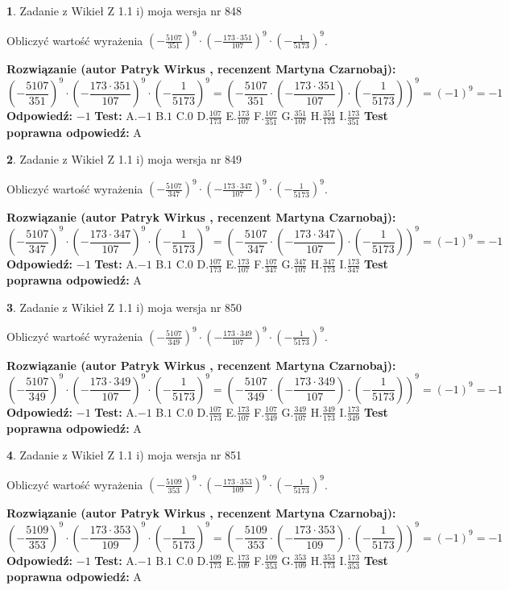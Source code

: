 \documentclass[12pt, a4paper]{article}
\theoremstyle{definition} %
\newtheorem{zad}{}
\newcommand{\zadStart}[1]{\begin{zad}#1\newline}
\newcommand{\zadStop}{\end{zad}}
\newcommand{\rozwStart}[2]{\noindent \textbf{Rozwiązanie (autor #1 , recenzent #2): }\newline}
\newcommand{\rozwStop}{\newline}
\newcommand{\odpStart}{\noindent \textbf{Odpowiedź:}\newline}
\newcommand{\odpStop}{\newline}
\newcommand{\testStart}{\noindent \textbf{Test:}\newline}
\newcommand{\testStop}{\newline}
\newcommand{\kluczStart}{\noindent \textbf{Test poprawna odpowiedź:}\newline}
\newcommand{\kluczStop}{\newline}
\begin{document}
\zadStart{Zadanie z Wikieł Z 1.1 i) moja wersja nr 848}

Obliczyć wartość wyrażenia $(-\frac{5107}{351})^{9} \cdot (-\frac{173 \cdot 351}{107})^{9} \cdot (-\frac{1}{5173})^{9}$.
\zadStop
\rozwStart{Patryk Wirkus}{Martyna Czarnobaj}
$$(-\frac{5107}{351})^{9} \cdot (-\frac{173 \cdot 351}{107})^{9} \cdot (-\frac{1}{5173})^{9} = (-\frac{5107}{351} \cdot (-\frac{173 \cdot 351}{107}) \cdot (-\frac{1}{5173}))^{9} = (-1)^{9} = -1$$
\rozwStop
\odpStart
$-1$
\odpStop
\testStart
A.$-1$ B.$1$ C.$0$ D.$\frac{107}{173}$ E.$\frac{173}{107}$
F.$\frac{107}{351}$ G.$\frac{351}{107}$
H.$\frac{351}{173}$
I.$\frac{173}{351}$
\testStop
\kluczStart
A
\kluczStop



\zadStart{Zadanie z Wikieł Z 1.1 i) moja wersja nr 849}

Obliczyć wartość wyrażenia $(-\frac{5107}{347})^{9} \cdot (-\frac{173 \cdot 347}{107})^{9} \cdot (-\frac{1}{5173})^{9}$.
\zadStop
\rozwStart{Patryk Wirkus}{Martyna Czarnobaj}
$$(-\frac{5107}{347})^{9} \cdot (-\frac{173 \cdot 347}{107})^{9} \cdot (-\frac{1}{5173})^{9} = (-\frac{5107}{347} \cdot (-\frac{173 \cdot 347}{107}) \cdot (-\frac{1}{5173}))^{9} = (-1)^{9} = -1$$
\rozwStop
\odpStart
$-1$
\odpStop
\testStart
A.$-1$ B.$1$ C.$0$ D.$\frac{107}{173}$ E.$\frac{173}{107}$
F.$\frac{107}{347}$ G.$\frac{347}{107}$
H.$\frac{347}{173}$
I.$\frac{173}{347}$
\testStop
\kluczStart
A
\kluczStop



\zadStart{Zadanie z Wikieł Z 1.1 i) moja wersja nr 850}

Obliczyć wartość wyrażenia $(-\frac{5107}{349})^{9} \cdot (-\frac{173 \cdot 349}{107})^{9} \cdot (-\frac{1}{5173})^{9}$.
\zadStop
\rozwStart{Patryk Wirkus}{Martyna Czarnobaj}
$$(-\frac{5107}{349})^{9} \cdot (-\frac{173 \cdot 349}{107})^{9} \cdot (-\frac{1}{5173})^{9} = (-\frac{5107}{349} \cdot (-\frac{173 \cdot 349}{107}) \cdot (-\frac{1}{5173}))^{9} = (-1)^{9} = -1$$
\rozwStop
\odpStart
$-1$
\odpStop
\testStart
A.$-1$ B.$1$ C.$0$ D.$\frac{107}{173}$ E.$\frac{173}{107}$
F.$\frac{107}{349}$ G.$\frac{349}{107}$
H.$\frac{349}{173}$
I.$\frac{173}{349}$
\testStop
\kluczStart
A
\kluczStop



\zadStart{Zadanie z Wikieł Z 1.1 i) moja wersja nr 851}

Obliczyć wartość wyrażenia $(-\frac{5109}{353})^{9} \cdot (-\frac{173 \cdot 353}{109})^{9} \cdot (-\frac{1}{5173})^{9}$.
\zadStop
\rozwStart{Patryk Wirkus}{Martyna Czarnobaj}
$$(-\frac{5109}{353})^{9} \cdot (-\frac{173 \cdot 353}{109})^{9} \cdot (-\frac{1}{5173})^{9} = (-\frac{5109}{353} \cdot (-\frac{173 \cdot 353}{109}) \cdot (-\frac{1}{5173}))^{9} = (-1)^{9} = -1$$
\rozwStop
\odpStart
$-1$
\odpStop
\testStart
A.$-1$ B.$1$ C.$0$ D.$\frac{109}{173}$ E.$\frac{173}{109}$
F.$\frac{109}{353}$ G.$\frac{353}{109}$
H.$\frac{353}{173}$
I.$\frac{173}{353}$
\testStop
\kluczStart
A
\kluczStop
\end{document}
